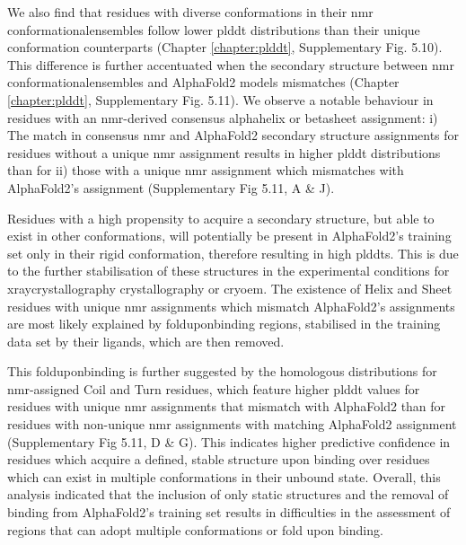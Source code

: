 We also find that residues with diverse \glspl{conformation} in their \gls{nmr} \glspl{conformationalensemble} follow lower \gls{plddt} distributions than their unique \gls{conformation} counterparts (Chapter \ref{chapter:plddt}, Supplementary Fig. 5.10). This difference is further accentuated when the secondary structure between \gls{nmr} \glspl{conformationalensemble} and AlphaFold2 models mismatches (Chapter \ref{chapter:plddt}, Supplementary Fig. 5.11). We observe a notable behaviour in residues with an \gls{nmr}-derived consensus \gls{alphahelix} or \gls{betasheet} assignment: i) The match in consensus \gls{nmr} and AlphaFold2 secondary structure assignments for residues without a unique \gls{nmr} assignment results in higher \gls{plddt} distributions than for ii) those with a unique \gls{nmr} assignment which mismatches with AlphaFold2's assignment (Supplementary Fig 5.11, A \& J). 

Residues with a high propensity to acquire a secondary structure, but able to exist in other \glspl{conformation}, will potentially be present in AlphaFold2's training set only in their rigid \gls{conformation}, therefore resulting in high \glspl{plddt}. This is due to the further stabilisation of these structures in the experimental conditions for \gls{xraycrystallography} crystallography or \gls{cryoem}. The existence of Helix and Sheet residues with unique \gls{nmr} assignments which mismatch AlphaFold2's assignments are most likely explained by \gls{folduponbinding} regions, stabilised in the training data set by their ligands, which are then removed. 

This \gls{folduponbinding} is further suggested by the homologous distributions for \gls{nmr}-assigned Coil and Turn residues, which feature higher \gls{plddt} values for residues with unique \gls{nmr} assignments that mismatch with AlphaFold2 than for residues with non-unique \gls{nmr} assignments with matching AlphaFold2 assignment (Supplementary Fig 5.11, D \& G). This indicates higher predictive confidence in residues which acquire a defined, stable structure upon binding over residues which can exist in multiple \glspl{conformation} in their unbound state. Overall, this analysis indicated that the inclusion of only static structures and the removal of binding from AlphaFold2's training set results in difficulties in the assessment of regions that can adopt multiple \glspl{conformation} or fold upon binding. 

